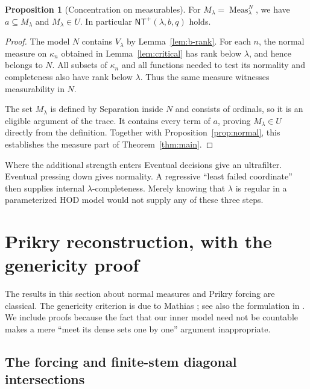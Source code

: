 \documentclass[11pt,letterpaper]{article}
\theoremstyle{definition}
\newtheorem{proposition}[definition]{Proposition}
\numberwithin{equation}{section}
\newcommand{\Meas}{\operatorname{Meas}}
\newcommand{\NTP}{\mathsf{NT}^{+}}
\begin{document}
\begin{proposition}[Concentration on measurables]\label{prop:concentration}
For $M_\lambda=\Meas_\lambda^N$, we have $a\subseteq M_\lambda$ and
$M_\lambda\in U$. In particular $\NTP(\lambda,b,q)$ holds.
\end{proposition}

\begin{proof}
The model $N$ contains $V_\lambda$ by Lemma~\ref{lem:b-rank}. For each
$n$, the normal measure on $\kappa_n$ obtained in
Lemma~\ref{lem:critical} has rank below $\lambda$, and hence belongs to
$N$. All subsets of $\kappa_n$ and all functions needed to test its
normality and completeness also have rank below $\lambda$. Thus the
same measure witnesses measurability in $N$.

The set $M_\lambda$ is defined by Separation inside $N$ and consists of
ordinals, so it is an eligible argument of the trace. It contains every
term of $a$, proving $M_\lambda\in U$ directly from the definition.
Together with Proposition~\ref{prop:normal}, this establishes the
measure part of Theorem~\ref{thm:main}.
\end{proof}

\begin{assessment}{Where the additional strength enters}
Eventual decisions give an ultrafilter. Eventual pressing down gives
normality. A regressive ``least failed coordinate'' then supplies
internal $\lambda$-completeness. Merely knowing that $\lambda$ is
regular in a parameterized HOD model would not supply any of these
three steps.
\end{assessment}

\section{Prikry reconstruction, with the genericity proof}\label{sec:prikry}

The results in this section about normal measures and Prikry forcing are
classical. The genericity criterion is due to Mathias \cite{mathias};
see also the formulation in \cite{merimovich}. We include proofs because
the fact that our inner model need not be countable makes a mere
``meet its dense sets one by one'' argument inappropriate.

\subsection{The forcing and finite-stem diagonal intersections}
\end{document}
